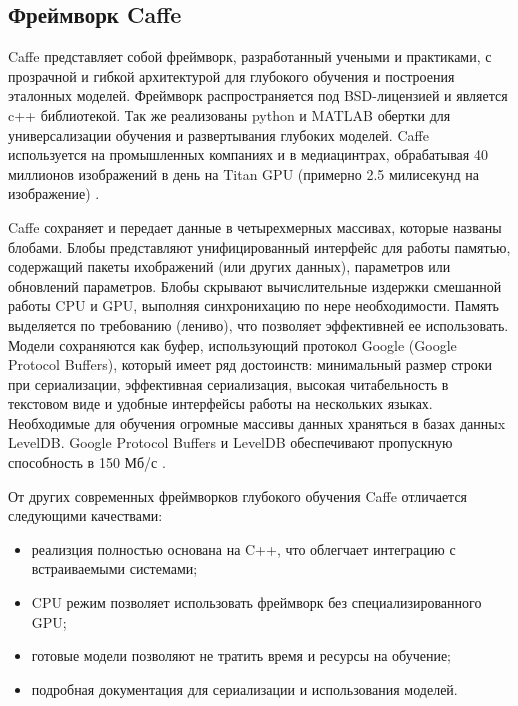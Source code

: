 \documentclass[a4paper,english,russian]{G2-105}
\begin{document}
\subsection{Фреймворк Caffe} \ttl
\par Caffe представляет собой фреймворк, разработанный учеными и практиками, с прозрачной и гибкой архитектурой для глубокого обучения и построения эталонных моделей. Фреймворк распространяется под BSD-лицензией и является c++ библиотекой. Так же реализованы python и MATLAB обертки для универсализации обучения и развертывания глубоких моделей. Caffe используется на промышленных компаниях и в медиацинтрах, обрабатывая 40 миллионов изображений в день на Titan GPU (примерно 2.5 милисекунд на изображение) \cite{11}.
\par Caffe сохраняет и передает данные в четырехмерных массивах, которые названы блобами. Блобы представляют унифицированный интерфейс для работы  памятью, содержащий пакеты ихображений (или других данных), параметров или обновлений параметров. Блобы скрывают вычислительные издержки смешанной работы CPU и GPU, выполняя синхронихацию по нере необходимости. Память выделяется по требованию (лениво), что позволяет эффективней ее использовать. Модели сохраняются как буфер, использующий протокол Google (Google Protocol Buffers), который имеет ряд достоинств: минимальный размер строки при сериализации, эффективная сериализация, высокая читабельность в текстовом виде и удобные интерфейсы работы на нескольких языках. Необходимые для обучения огромные массивы данных храняться в базах данныx LevelDB. Google Protocol Buffers и LevelDB обеспечивают пропускную способность в 150 Мб/с \cite{12}.
\par От других современных фреймворков глубокого обучения Caffe отличается следующими качествами:
\begin{itemize}
	\item реализция полностью основана на C++, что облегчает интеграцию с встраиваемыми системами;
	\item CPU режим позволяет использовать фреймворк без специализированного GPU;
	\item готовые модели позволяют не тратить время и ресурсы на обучение;
	\item подробная документация для сериализации и использования моделей.
\end{itemize}
\ttl
\end{document}

